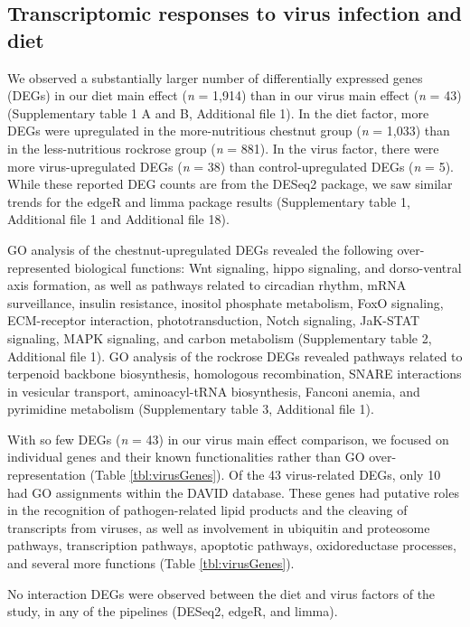 \documentclass{bmcart}
\begin{document}
\begin{linenumbers}
\begin{doublespacing}
\subsection*{Transcriptomic responses to virus infection and diet}

We observed a substantially larger number of differentially expressed genes (DEGs) in our diet main effect (\textit{n} = 1,914) than in our virus main effect (\textit{n} = 43) (Supplementary table 1 A and B, Additional file 1). In the diet factor, more DEGs were upregulated in the more-nutritious chestnut group (\textit{n} = 1,033) than in the less-nutritious rockrose group (\textit{n} = 881). In the virus factor, there were more virus-upregulated DEGs (\textit{n} = 38) than control-upregulated DEGs (\textit{n} = 5). While these reported DEG counts are from the DESeq2 package, we saw similar trends for the edgeR and limma package results (Supplementary table 1, Additional file 1 and Additional file 18).

GO analysis of the chestnut-upregulated DEGs revealed the following over-represented biological functions: Wnt signaling, hippo signaling, and dorso-ventral axis formation, as well as pathways related to circadian rhythm, mRNA surveillance, insulin resistance, inositol phosphate metabolism, FoxO signaling, ECM-receptor interaction, phototransduction, Notch signaling, JaK-STAT signaling, MAPK signaling, and carbon metabolism (Supplementary table 2, Additional file 1). GO analysis of the rockrose DEGs revealed pathways related to terpenoid backbone biosynthesis, homologous recombination, SNARE interactions in vesicular transport, aminoacyl-tRNA biosynthesis, Fanconi anemia, and pyrimidine metabolism (Supplementary table 3, Additional file 1).

With so few DEGs (\textit{n} = 43) in our virus main effect comparison, we focused on individual genes and their known functionalities rather than GO over-representation (Table \ref{tbl:virusGenes}). Of the 43 virus-related DEGs, only 10 had GO assignments within the DAVID database. These genes had putative roles in the recognition of pathogen-related lipid products and the cleaving of transcripts from viruses, as well as involvement in ubiquitin and proteosome pathways, transcription pathways, apoptotic pathways, oxidoreductase processes, and several more functions (Table \ref{tbl:virusGenes}).

No interaction DEGs were observed between the diet and virus factors of the study, in any of the pipelines (DESeq2, edgeR, and limma).


\end{doublespacing}
\end{linenumbers}
\end{document}
